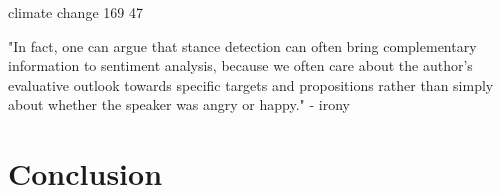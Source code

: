\documentclass[a4paper,12pt,twoside]{article}
\begin{document}
climate change
169
47


"In fact, one can argue that stance detection can often bring complementary information to sentiment analysis, because we often care about the author’s evaluative outlook towards specific targets and propositions rather than simply about whether the speaker was angry or happy."
- irony
 

\section{Conclusion}




 
\end{document}
